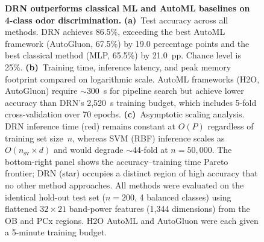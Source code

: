 
\begin{figure}[t]
\centering
\caption{\textbf{DRN outperforms classical ML and AutoML baselines on 4-class
odor discrimination.}
\textbf{(a)}~Test accuracy across all methods. DRN achieves 86.5\%, exceeding
the best AutoML framework (AutoGluon, 67.5\%) by 19.0 percentage points and
the best classical method (MLP, 65.5\%) by 21.0~pp. Chance level is 25\%.
\textbf{(b)}~Training time, inference latency, and peak memory footprint
compared on logarithmic scale. AutoML frameworks (H2O, AutoGluon) require
$\sim$300~s for pipeline search but achieve lower accuracy than DRN's
2,520~s training budget, which includes 5-fold cross-validation over 70
epochs.
\textbf{(c)}~Asymptotic scaling analysis. DRN inference time (red) remains
constant at $O(P)$ regardless of training set size~$n$, whereas SVM (RBF)
inference scales as $O(n_{\text{sv}} \times d)$ and would degrade
$\sim$44-fold at $n = 50{,}000$.
The bottom-right panel shows the accuracy--training time Pareto frontier;
DRN (star) occupies a distinct region of high accuracy that no other method
approaches.
All methods were evaluated on the identical hold-out test set ($n = 200$,
4 balanced classes) using flattened $32 \times 21$ band-power features
(1,344 dimensions) from the OB and PCx regions. H2O AutoML and AutoGluon
were each given a 5-minute training budget.}
\label{fig:complexity}
\end{figure}
